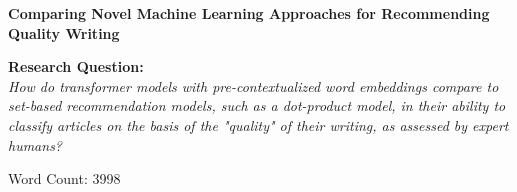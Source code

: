 \begin{titlepage}
    \begin{center}
        \vspace*{1cm}
            
        \huge
        \textbf{Comparing Novel Machine Learning Approaches for Recommending Quality Writing}
            
        \vspace{0.5cm}

        \vspace{1.5cm}
        
        \vfill
        
        \Large
        \textbf{Research Question: } \\
        \large
        \emph{How do transformer models with pre-contextualized word embeddings compare to set-based recommendation models, such as a dot-product model, in their ability to classify articles on the basis of the "quality" of their writing, as assessed by expert humans?}
            
        \vspace{0.8cm}
            
        \Large
        Word Count: 3998
            
    \end{center}
\end{titlepage}